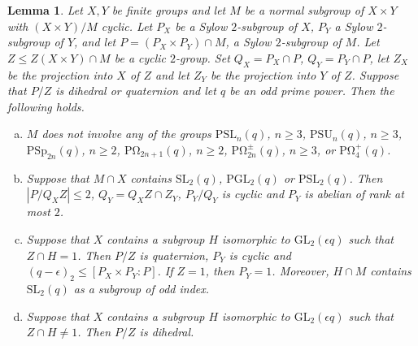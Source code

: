 \documentclass{amsart}
\theoremstyle{plain}\newtheorem{Theorem}{Theorem}[section]
\theoremstyle{plain}\newtheorem{Conjecture}[Theorem]{Conjecture}
\theoremstyle{plain}\newtheorem{Corollary}[Theorem]{Corollary}
\theoremstyle{plain}\newtheorem{Lemma}[Theorem]{Lemma}
\theoremstyle{plain}\newtheorem{Proposition}[Theorem]{Proposition}
\theoremstyle{definition}\newtheorem{Definition}[Theorem]{Definition}
\theoremstyle{definition}\newtheorem{Example}[Theorem]{Example}
\theoremstyle{definition}\newtheorem{Examples}[Theorem]{Examples}
\theoremstyle{definition}\newtheorem{Exercise}[Theorem]{Exercise}
\theoremstyle{definition}\newtheorem{Notation}[Theorem]{Notation}
\theoremstyle{definition}\newtheorem{Remark}[Theorem]{Remark}
\theoremstyle{definition}\newtheorem{Remarks}[Theorem]{Remarks}
\def\GL{\mathrm{GL}}
\def\PGL{\mathrm{PGL}}
\def\PO{\mathrm{P\Omega}}
\def\PSL{\mathrm{PSL}}
\def\PSp{\mathrm{PSp}}
\def\PSU{\mathrm{PSU}}
\def\SL{\mathrm{SL}}
\numberwithin{equation}{section}
\begin{document}
\begin{Lemma}\label{lem:noSL2} Let $X, Y $ be  finite groups and  let $M$ be a normal  subgroup of  $X\times Y $ with $(X \times Y)/M$  cyclic.  Let $P_X $  be a  Sylow $2$-subgroup  of $X$, $P_Y $  a  Sylow $2$-subgroup  of $Y$, and let $P  =(P_X\times P_Y) \cap M$, a Sylow $2$-subgroup of $M$.  Let $Z \leq  Z(X \times Y) \cap M $  be a cyclic $2$-group.    Set $Q_X=  P_X\cap   P $, $Q_Y = P_Y \cap P$,   let  $Z_X $ be the projection  into   $X$ of $ Z$ and let   $Z_Y $ be the projection  into   $Y$ of $ Z$. 
Suppose that $P/Z$ is dihedral or quaternion  and let $q$ be an odd prime power.   Then the following holds.
\begin{enumerate} [(a)]\item  $M$  does not involve any of  the groups   $\PSL_n(q)$,  $n\geq 3 $,  $\PSU_n(q) $, $n \geq 3 $, $\PSp_{2n}(q)$, $n\geq 2$, $\PO_{2n+1}(q)$, $n \geq  2$, $\PO_{2n}^{\pm}(q)$, $n\geq 3$, or  $\PO_4^{+} (q)$.  
\item      Suppose that $M \cap X $ contains  $\SL_2 (q)$,  $\PGL_2(q)$  or $\PSL_2(q) $.  Then $ |P/Q_XZ| \leq 2 $,   $Q_Y =Q_XZ\cap  Z_Y$,  $P_Y/Q_Y$ is cyclic and $P_Y $ is  abelian of rank at most $2$.    
\item  Suppose that   $X$ contains  a  subgroup $H$  isomorphic to   $\GL_2 (\epsilon q) $  such that 
  $Z \cap  H =1 $.   Then $P/Z$ is quaternion,   $P_Y$ is  cyclic   and $ (q-\epsilon)_2 \leq  [P_X \times  P_Y: P]$. If    $Z=1$, then $P_Y=1 $.   Moreover, $H \cap M  $  contains $ \SL_2(q) $ as  a subgroup of odd index.
  \item   Suppose that  $X$ contains  a  subgroup $H$  isomorphic to   $\GL_2 (\epsilon q) $  such that   $Z \cap  H \ne 1 $. Then  $P/Z$   is dihedral.
 \end{enumerate}
\end{Lemma} 
\end{document}
